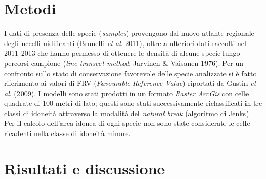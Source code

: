 \section*{Metodi}

I dati di presenza delle specie (\textit{samples}) provengono dal nuovo
atlante regionale degli uccelli nidificanti (Brunelli \textit{et al}.
2011), oltre a ulteriori dati raccolti nel 2011-2013 che hanno permesso
di ottenere le densit\`a di alcune specie lungo percorsi campione
(\textit{line transect method}: Jarvinen \& Vaisanen 1976). Per un
confronto sullo stato di conservazione favorevole delle specie
analizzate si \`e fatto riferimento ai valori di FRV
(\textit{Favourable Reference Value}) riportati da Gustin \textit{et
al}. (2009). I modelli sono stati prodotti in un formato \textit{Raster
ArcGis} con celle quadrate di 100 metri di lato; questi sono stati
successivamente riclassificati in tre classi di idoneit\`a attraverso
la modalit\`a del \textit{natural break} (algoritmo di Jenks). Per il
calcolo dell{\textquoteright}area idonea di ogni specie non sono state
considerate le celle ricadenti nella classe di idoneit\`a minore. 

\section*{Risultati e discussione}

